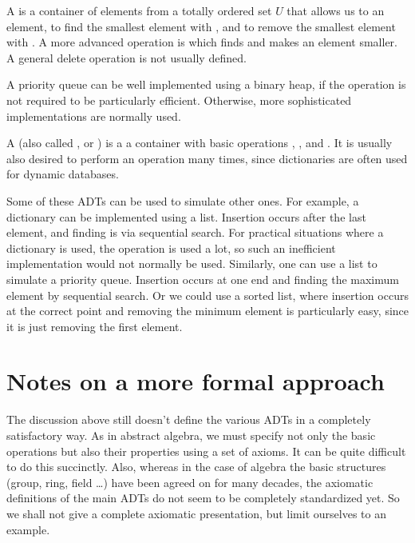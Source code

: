A  is a container of elements from a totally
ordered set $U$ that allows us to  an element, to
find the smallest element with , and to remove the
smallest element with .
 A more advanced operation is  which finds and makes 
an element smaller. A general delete operation is not usually defined.

A priority queue can be well implemented using a binary heap, if the
operation  is not required to be particularly efficient. 
Otherwise, more sophisticated implementations are normally used.

A  (also called , 
or ) is a a container with basic operations
, , and . It is usually
also desired to perform an  operation many times, since
dictionaries are often used for dynamic databases.

Some of these ADTs can be used to simulate other ones. For example,
a dictionary can be implemented using a list. Insertion occurs
after the last element, and finding is via sequential search. For
practical situations where a dictionary is used, the 
operation is used a lot, so such an inefficient implementation would not
normally be used. Similarly, one can use a list to simulate a priority
queue. Insertion occurs at one end and finding the maximum element by
sequential search. Or we could use a sorted list, where insertion occurs
at the correct point and removing the minimum element is particularly
easy, since it is just removing the first element.

\section{Notes on a more formal approach}
\label{sec:app:adt-formal}

The discussion above still doesn't define the various ADTs in a completely
satisfactory way. As in abstract algebra, we must specify not only the
basic operations but also their properties using a set of axioms. It can
be quite difficult to do this succinctly. Also, whereas in the case of
algebra the basic structures (group, ring, field \dots) have been agreed
on for many decades, the axiomatic definitions of the main ADTs do not
seem to be completely standardized yet. So we shall not give a complete
axiomatic presentation, but limit ourselves to an example.

